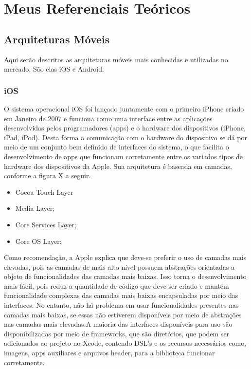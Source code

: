 \part{Meus Referenciais Teóricos}

\chapter[Arquiteturas móveis]{Arquiteturas Móveis}

Aqui serão descritos as arquiteturas móveis mais conhecidas e utilizadas no mercado. São elas iOS e Android.

\section{iOS}

O sistema operacional iOS foi lançado juntamente com o primeiro iPhone criado em Janeiro de 2007 e 
funciona como uma interface entre as aplicações desenvolvidas pelos programadores (apps) e o hardware 
dos dispositivos (iPhone, iPad, iPod). Desta forma a comunicação com o hardware do dispositivo se dá 
por meio de um conjunto bem definido de interfaces do sistema, o que facilita o desenvolvimento de apps 
que funcionam corretamente entre os variados tipos de hardware dos dispositivos da Apple. Sua arquitetura 
é baseada em camadas, conforme a figura X a seguir.
 
\begin{itemize}

	\item Cocoa Touch Layer
	\item Media Layer;
	\item Core Services Layer;
	\item Core OS Layer;

\end{itemize}

Como recomendação, a Apple explica que deve-se preferir o uso de camadas mais elevadas, pois as camadas de 
mais alto nível possuem abstrações orientadas a objeto de funcionalidades das camadas mais baixas. Isso 
torna o desenvolvimento mais fácil, pois reduz a quantidade de código que deve ser criado e mantém funcionalidade 
complexas das camadas mais baixas encapsuladas por meio das interfaces. No entanto, não há problema em usar 
funcionalidades presentes nas camadas mais baixas, se essas não estiverem disponíveis por meio de abstrações nas 
camadas mais elevadas.A maioria das interfaces disponíveis para uso são disponibilizadas por meio de frameworks, 
que são diretórios, que podem ser adicionados ao projeto no Xcode, contendo DSL's e os recursos necessários como, 
imagens, apps auxiliares e arquivos header, para a biblioteca funcionar corretamente.

